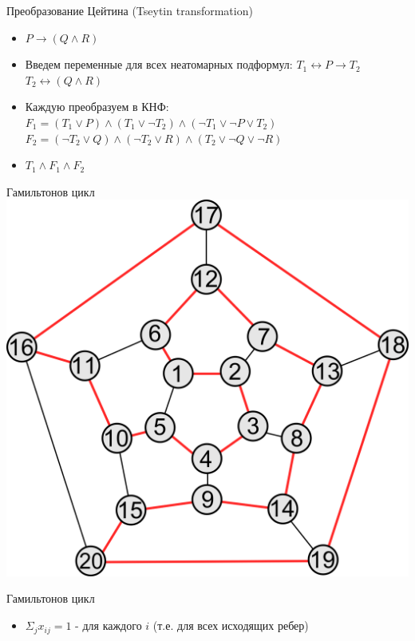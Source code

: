 \documentclass{beamer}
\begin{document}
\begin{frame}{Преобразование Цейтина (Tseytin transformation)}
\begin{itemize}
\item $P \rightarrow (Q \wedge R)$
\item Введем переменные для всех неатомарных подформул:\newline
$T_1 \leftrightarrow P \rightarrow T_2$\newline
$T_2 \leftrightarrow (Q \wedge R)$\newline
\item Каждую преобразуем в КНФ:\newline
$F_1 = (T_1 \vee P) \wedge (T_1 \vee \lnot T_2) \wedge (\lnot T_1 \vee \lnot P \vee T_2)$\newline
$F_2 = (\lnot T_2 \vee Q) \wedge (\lnot T_2 \vee R) \wedge (T_2 \vee \lnot Q \vee \lnot R)$\newline
\item $T_1 \wedge F_1 \wedge F_2$
\end{itemize}
\end{frame}

\begin{frame}{Гамильтонов цикл}
\includegraphics[scale=0.4]{Hamiltonial.png}
\end{frame}

\begin{frame}{Гамильтонов цикл}
\begin{itemize}
\item $\Sigma_{j} x_{ij} = 1$ - для каждого $i$ (т.е. для всех исходящих ребер)
\end{itemize}
\end{frame}
\end{document}
